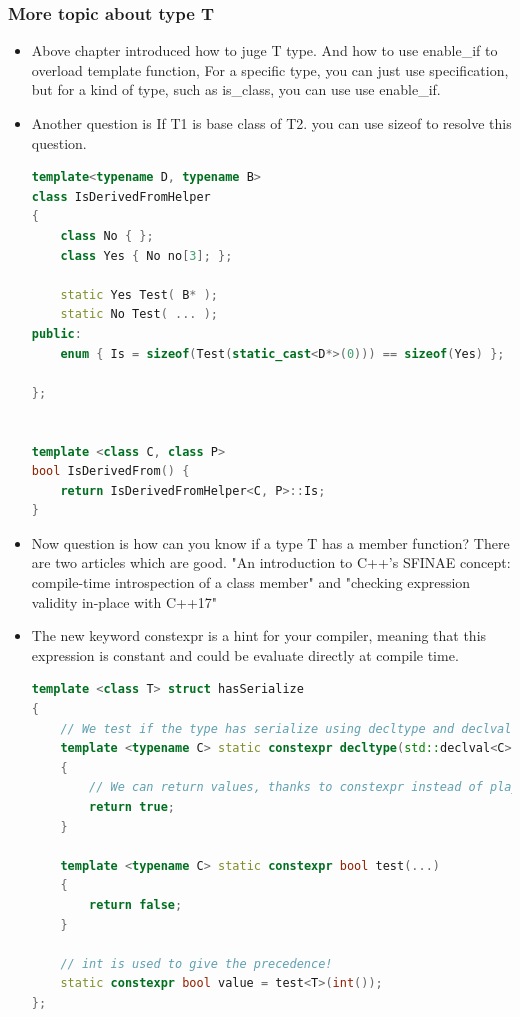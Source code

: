 \documentclass[a4paper,12pt,twoside]{book}
\begin{document}
\subsubsection{More topic about type T}
\begin{itemize}
\item Above chapter introduced how to juge T type. And how to use enable\_if to overload template function, For a specific type, you can just use specification, but for a kind of type, such as is\_class, you can use use enable\_if. 

\item Another question is If T1 is base class of T2. you can use sizeof to resolve this question.
\begin{lstlisting}[frame=single, language=c++]
template<typename D, typename B>
class IsDerivedFromHelper
{
    class No { };
    class Yes { No no[3]; };
    
    static Yes Test( B* );
    static No Test( ... );
public:
    enum { Is = sizeof(Test(static_cast<D*>(0))) == sizeof(Yes) };
    
};


template <class C, class P> 
bool IsDerivedFrom() {
    return IsDerivedFromHelper<C, P>::Is;
}
\end{lstlisting}

\item Now question is how can you know if a type T has a member function? There are two articles which are good.
"An introduction to C++'s SFINAE concept: compile-time introspection of a class member" and "checking expression validity in-place with C++17"

\item The new keyword constexpr is a hint for your compiler, meaning that this expression is constant and could be evaluate directly at compile time. 

\begin{lstlisting}[frame=single, language=c++]
template <class T> struct hasSerialize
{
    // We test if the type has serialize using decltype and declval.
    template <typename C> static constexpr decltype(std::declval<C>().serialize(), bool()) test(int /* unused */)
    {
        // We can return values, thanks to constexpr instead of playing with sizeof.
        return true;
    }

    template <typename C> static constexpr bool test(...)
    {
        return false;
    }

    // int is used to give the precedence!
    static constexpr bool value = test<T>(int());
};


\end{lstlisting}
\end{itemize}
\end{document}
